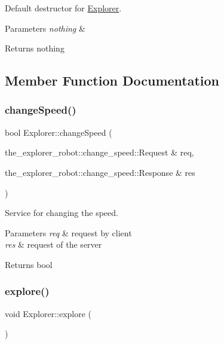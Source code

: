 Default destructor for \mbox{\hyperlink{classExplorer}{Explorer}}. 


\begin{DoxyParams}{Parameters}
{\em nothing} & \\
\hline
\end{DoxyParams}
\begin{DoxyReturn}{Returns}
nothing 
\end{DoxyReturn}


\subsection{Member Function Documentation}
\mbox{\label{classExplorer_aa860260292752413282de7f9d9ddfbc2}} 
\subsubsection{\texorpdfstring{change\+Speed()}{changeSpeed()}}
{\footnotesize\ttfamily bool Explorer\+::change\+Speed (\begin{DoxyParamCaption}\item[{the\+\_\+explorer\+\_\+robot\+::change\+\_\+speed\+::\+Request \&}]{req,  }\item[{the\+\_\+explorer\+\_\+robot\+::change\+\_\+speed\+::\+Response \&}]{res }\end{DoxyParamCaption})}



Service for changing the speed. 


\begin{DoxyParams}{Parameters}
{\em req} & request by client \\
\hline
{\em res} & request of the server\\
\hline
\end{DoxyParams}
\begin{DoxyReturn}{Returns}
bool 
\end{DoxyReturn}
\mbox{\label{classExplorer_a246ceb49142bbd15bdbdc3b900269294}} 
\subsubsection{\texorpdfstring{explore()}{explore()}}
{\footnotesize\ttfamily void Explorer\+::explore (\begin{DoxyParamCaption}{ }\end{DoxyParamCaption})}



